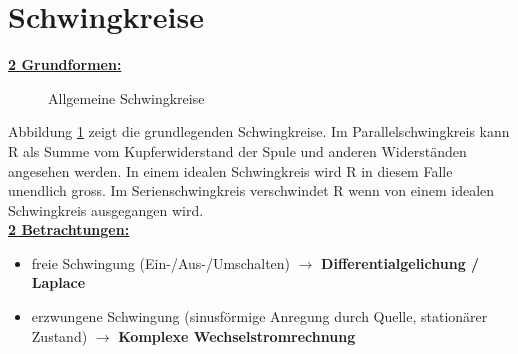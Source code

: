 \section{Schwingkreise}
\underline{\textbf{2 Grundformen:}}\\
\begin{figure}[!h]
\centering
{}
\qquad
{}
\caption{Allgemeine Schwingkreise}
\label{fig:schwingkreise}
\end{figure}


Abbildung \ref{fig:schwingkreise} zeigt die grundlegenden Schwingkreise. Im
Parallelschwingkreis  kann R als Summe vom
Kupferwiderstand der Spule und anderen Widerständen angesehen werden. In einem
idealen Schwingkreis wird R in diesem Falle unendlich gross. Im
Serienschwingkreis  verschwindet R wenn von
einem idealen Schwingkreis ausgegangen wird. \\

\underline{\textbf{2 Betrachtungen:}}\\
\begin{itemize}
  \item freie Schwingung (Ein-/Aus-/Umschalten) $\rightarrow$
  \textbf{Differentialgelichung / Laplace}
  \item erzwungene Schwingung (sinusförmige Anregung durch Quelle, stationärer
  Zustand) $\rightarrow$ \textbf{Komplexe Wechselstromrechnung}
\end{itemize}






